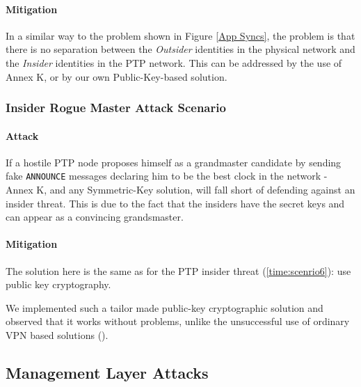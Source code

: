 \documentclass[11pt]{article}
\begin{document}
\paragraph{Mitigation}\label{bmc:scenrio1mit}

In a similar way to the problem shown in Figure \ref{App Syncs}, the problem is that there is no separation between the \emph{Outsider} identities in the physical network and the \emph{Insider} identities in the PTP network. This can be addressed by the use of Annex K, or by our own Public-Key-based solution.



\subsubsection{Insider Rogue Master Attack Scenario}\label{bmc:scenrio2}

\paragraph{Attack}

If a hostile PTP node proposes himself as a grandmaster candidate by sending fake \texttt{ANNOUNCE} messages declaring him to be the best clock in the network - Annex K, and any Symmetric-Key solution, will fall short of defending against an insider threat. This is due to the fact that the insiders have the secret keys and can appear as a convincing grandsmaster.



\paragraph{Mitigation}\label{bmc:scenrio2mit}

The solution here is the same as for the PTP insider threat (\ref{time:scenrio6}): use public key cryptography.



We implemented such a tailor made public-key cryptographic solution and observed that it works without problems, unlike the unsuccessful use of ordinary VPN based solutions (\cite{nokia}).





\subsection{Management Layer Attacks}\label{attack:management}
\end{document}
